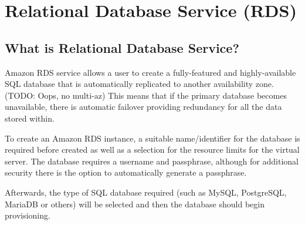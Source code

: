 \chapter{Relational Database Service (RDS)}\label{ch:relational-database-service}
\section{What is Relational Database Service?}
Amazon RDS service allows a user to create a fully-featured and highly-available SQL database that is automatically
replicated to another availability zone. (TODO: Oops, no multi-az) This means that if the primary database becomes
unavailable, there is automatic failover providing redundancy for all the data stored within.

To create an Amazon RDS instance, a suitable name/identifier for the database is required before created as well as a
selection for the resource limits for the virtual server.
The database requires a username and passphrase, although for additional security there is the option to automatically
generate a passphrase.

Afterwards, the type of SQL database required (such as MySQL, PostgreSQL, MariaDB or others) will be selected and then
the database should begin provisioning.

